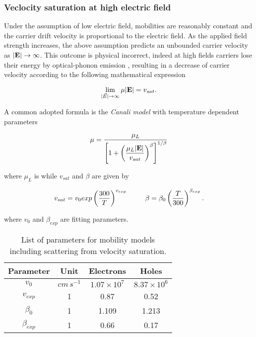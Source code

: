 \subsubsection{Veclocity saturation at high electric field}

Under the assumption of low electric field, mobilities are reasonably constant and the carrier drift velocity is proportional to the electric field. As the applied field strength increases, the above assumption predicts an unbounded carrier velocity as $|\mathbf{E}| \rightarrow \infty$. This outcome is physical incorrect, indeed at high fields carriers lose their energy by optical-phonon emission \cite{ModernVLSIdevices}, resulting in a decrease of carrier velocity according to the following mathematical expression

\begin{equation}
\label{eq: velocity saturation}
\lim_{|\vec{E}| \to \infty} \mu |\mathbf{E}| = v_{sat}.
\end{equation} 

A common adopted formula is the \textit{Canali model} \cite{Canali:Vsat} with temperature dependent parameters

\begin{equation}
\label{eq: mobility canali}
\mu = \dfrac{\mu_{L}}{\left[ 1 + \left( \dfrac{\mu_{L}|\mathbf{E}|}{v_{sat}} \right)^{\beta}   \right]^{1/\beta}} 
\end{equation}

where $\mu_L$ is  while $v_{sat}$ and $\beta$ are given by

\begin{equation}
\label{eq: mobility canali beta}
v_{sat} = v_0exp\left( 	\dfrac{300}{T} \right)^{v_{exp}} 
\psp{15}
\beta= \beta_0 \left( \dfrac{T}{300} \right)^{\beta_{exp}}.
\end{equation}

where $v_0$ and $\beta_{exp}$ are fitting parameters.

\begin{table}[!h]
\centering
\begin{tabular}{cccc}
\toprule
Parameter & Unit & Electrons & Holes \\
\midrule
$v_0$ & $cm\,s^{-1}$ & $1.07\times 10^{7}$ & $8.37\times 10^{6}$\\
$v_{exp}$ & 1 & 0.87 & 0.52\\
$\beta_0$ & 1 & 1.109 & 1.213 \\
$\beta_{exp}$ & 1 & 0.66 & 0.17\\
\bottomrule
\end{tabular}
\caption{List of parameters for mobility models including scattering from velocity saturation.}
\end{table}

